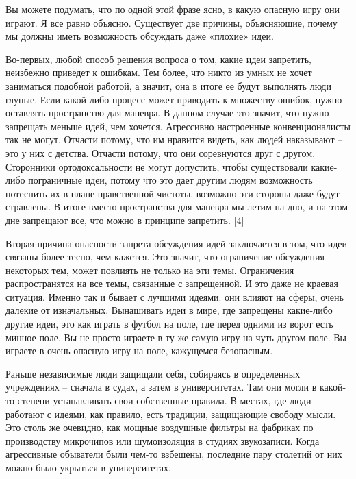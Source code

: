 \documentclass[ebook,12pt,oneside,openany]{memoir}
\begin{document}
Вы можете подумать, что по одной этой фразе ясно, в какую опасную игру
они играют. Я все равно объясню. Существует две причины, объясняющие,
почему мы должны иметь возможность обсуждать даже «плохие» идеи. \newline

Во-первых, любой способ решения вопроса о том, какие идеи запретить,
неизбежно приведет к ошибкам. Тем более, что никто из умных не хочет
заниматься подобной работой, а значит, она в итоге ее будут выполнять
люди глупые. Если какой-либо процесс может приводить к множеству
ошибок, нужно оставлять пространство для маневра. В данном случае это
значит, что нужно запрещать меньше идей, чем хочется. Агрессивно
настроенные конвенционалисты так не могут. Отчасти потому, что им
нравится видеть, как людей наказывают – это у них с детства. Отчасти
потому, что они соревнуются друг с другом. Сторонники ортодоксальности
не могут допустить, чтобы существовали какие-либо пограничные идеи,
потому что это дает другим людям возможность потеснить их в плане
нравственной чистоты, возможно эти стороны даже будут стравлены. В
итоге вместо пространства для маневра мы летим на дно, и на этом дне
запрещают все, что можно в принципе запретить. [4] \newline

Вторая причина опасности запрета обсуждения идей заключается в том,
что идеи связаны более тесно, чем кажется. Это значит, что ограничение
обсуждения некоторых тем, может повлиять не только на эти темы.
Ограничения распространятся на все темы, связанные с запрещенной. И
это даже не краевая ситуация. Именно так и бывает с лучшими идеями:
они влияют на сферы, очень далекие от изначальных. Вынашивать идеи в
мире, где запрещены какие-либо другие идеи, это как играть в футбол на
поле, где перед одними из ворот есть минное поле. Вы не просто играете
в ту же самую игру на чуть другом поле. Вы играете в очень опасную
игру на поле, кажущемся безопасным. \newline

Раньше независимые люди защищали себя, собираясь в определенных
учреждениях – сначала в судах, а затем в университетах. Там они могли
в какой-то степени устанавливать свои собственные правила. В местах,
где люди работают с идеями, как правило, есть традиции, защищающие
свободу мысли. Это столь же очевидно, как мощные воздушные фильтры на
фабриках по производству микрочипов или шумоизоляция в студиях
звукозаписи. Когда агрессивные обыватели были чем-то взбешены,
последние пару столетий от них можно было укрыться в университетах. \newline
\end{document}
